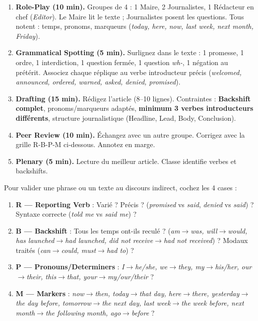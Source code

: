 \documentclass[11pt]{article}
\newcommand{\cle}[1]{{\popxbold\color{popdark}#1}}
\begin{document}
\begin{methode}
\begin{enumerate}
\item \textbf{Role-Play (10 min).} Groupes de 4 : 1 Maire, 2 Journalistes, 1 Rédacteur en chef (\emph{Editor}). Le Maire lit le texte ; Journalistes posent les questions. Tous notent : temps, pronoms, marqueurs (\emph{today, here, now, last week, next month, Friday}).
\item \textbf{Grammatical Spotting (5 min).} Surlignez dans le texte : 1 promesse, 1 ordre, 1 interdiction, 1 question fermée, 1 question \emph{wh-}, 1 négation au prétérit. Associez chaque réplique au verbe introducteur précis (\emph{welcomed, announced, ordered, warned, asked, denied, promised}).
\item \textbf{Drafting (15 min).} Rédigez l'article (8--10 lignes). Contraintes : \textbf{Backshift complet}, pronoms/marqueurs adaptés, \textbf{minimum 3 verbes introducteurs différents}, structure journalistique (Headline, Lead, Body, Conclusion).
\item \textbf{Peer Review (10 min).} Échangez avec un autre groupe. Corrigez avec la grille \cle{R-B-P-M} ci-dessous. Annotez en marge.
\item \textbf{Plenary (5 min).} Lecture du meilleur article. Classe identifie verbes et backshifts.
\end{enumerate}
\end{methode}

\begin{methode}
Pour valider une phrase ou un texte au discours indirect, cochez les 4 cases :
\begin{enumerate}
\item \textbf{R — Reporting Verb} : Varié ? Précis ? (\emph{promised} vs \emph{said}, \emph{denied} vs \emph{said}) ? Syntaxe correcte (\emph{told me} vs \emph{said me}) ?
\item \textbf{B — Backshift} : Tous les temps ont-ils reculé ? (\emph{am$\rightarrow$was, will$\rightarrow$would, has launched$\rightarrow$had launched, did not receive$\rightarrow$had not received}) ? Modaux traités (\emph{can$\rightarrow$could, must$\rightarrow$had to}) ?
\item \textbf{P — Pronouns/Determiners} : \emph{I$\rightarrow$he/she, we$\rightarrow$they, my$\rightarrow$his/her, our$\rightarrow$their, this$\rightarrow$that, your$\rightarrow$my/our/their} ?
\item \textbf{M — Markers} : \emph{now$\rightarrow$then, today$\rightarrow$that day, here$\rightarrow$there, yesterday$\rightarrow$the day before, tomorrow$\rightarrow$the next day, last week$\rightarrow$the week before, next month$\rightarrow$the following month, ago$\rightarrow$before} ?
\end{enumerate}
\end{methode}
\end{document}
